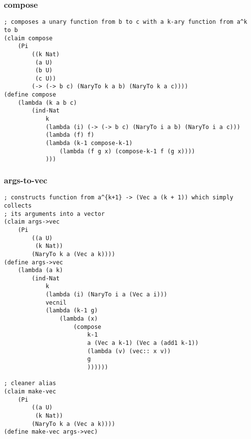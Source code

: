 \subsubsection{compose} \label{code:compose}
\begin{lstlisting}
; composes a unary function from b to c with a k-ary function from a^k to b
(claim compose
    (Pi 
        ((k Nat)
         (a U)
         (b U)
         (c U))
        (-> (-> b c) (NaryTo k a b) (NaryTo k a c))))
(define compose
    (lambda (k a b c)
        (ind-Nat
            k
            (lambda (i) (-> (-> b c) (NaryTo i a b) (NaryTo i a c)))
            (lambda (f) f)
            (lambda (k-1 compose-k-1)
                (lambda (f g x) (compose-k-1 f (g x))))
            )))
\end{lstlisting}

\subsubsection{args-to-vec} \label{code:args-to-vec}
\begin{lstlisting}
; constructs function from a^{k+1} -> (Vec a (k + 1)) which simply collects 
; its arguments into a vector
(claim args->vec
    (Pi 
        ((a U) 
         (k Nat)) 
        (NaryTo k a (Vec a k))))
(define args->vec
    (lambda (a k)
        (ind-Nat
            k
            (lambda (i) (NaryTo i a (Vec a i)))
            vecnil
            (lambda (k-1 g)
                (lambda (x)
                    (compose
                        k-1
                        a (Vec a k-1) (Vec a (add1 k-1))
                        (lambda (v) (vec:: x v))
                        g
                        ))))))

; cleaner alias
(claim make-vec
    (Pi 
        ((a U) 
         (k Nat)) 
        (NaryTo k a (Vec a k))))
(define make-vec args->vec)
\end{lstlisting}

